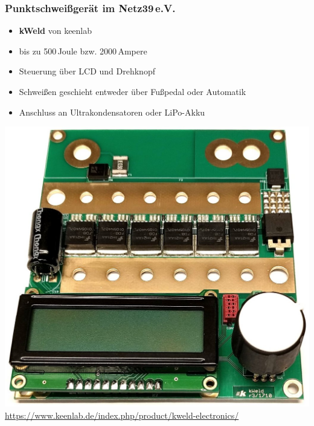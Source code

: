 \documentclass[handout, usenames,dvipsnames, nosymbols,aspectratio=169]{beamer}
\begin{document}
	\begin{frame}
		\frametitle{Punktschweißgerät im Netz39\,e.V.}
		\begin{minipage}{0.5\textwidth}	
			\begin{itemize}
				\item \textbf{kWeld} von keenlab
				\item bis zu 500\,Joule bzw. 2000\,Ampere
				\item Steuerung über LCD und Drehknopf
				\item Schweißen geschieht entweder über Fußpedal oder Automatik
				\item Anschluss an Ultrakondensatoren oder LiPo-Akku
			\end{itemize}
		\end{minipage}
		\begin{minipage}{0.45\textwidth}
			\includegraphics[width=\textwidth]{images/kWeld-electronics.jpg}
			\tiny
			{\color{gray}\url{https://www.keenlab.de/index.php/product/kweld-electronics/}}
		\end{minipage}
	\end{frame}
	
\end{document}
